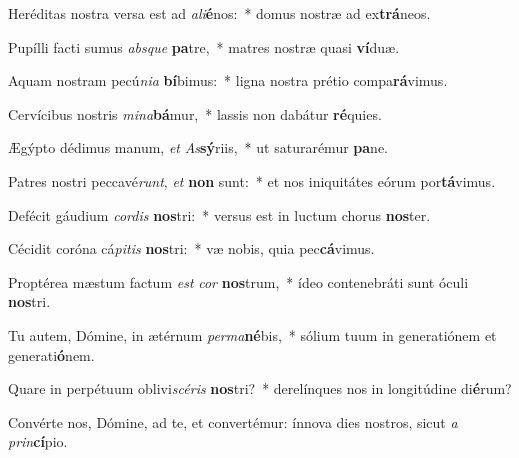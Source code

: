 \item Heréditas nostra versa est ad \textit{a}\textit{li}\textbf{é}nos:~* domus nostræ ad ex\textbf{trá}neos.
\item Pupílli facti sumus \textit{abs}\textit{que} \textbf{pa}tre,~* matres nostræ quasi \textbf{ví}duæ.
\item Aquam nostram pecú\textit{ni}\textit{a} \textbf{bí}bimus:~* ligna nostra prétio compa\textbf{rá}vimus.
\item Cervícibus nostris \textit{mi}\textit{na}\textbf{bá}mur,~* lassis non dabátur \textbf{ré}quies.
\item Ægýpto dédimus manum, \textit{et} \textit{As}\textbf{sý}riis,~* ut saturarémur \textbf{pa}ne.
\item Patres nostri peccavé\textit{runt}, \textit{et} \textbf{non} sunt:~* et nos iniquitátes eórum por\textbf{tá}vimus.
\item Defécit gáudium \textit{cor}\textit{dis} \textbf{nos}tri:~* versus est in luctum chorus \textbf{nos}ter.
\item Cécidit coróna cá\textit{pi}\textit{tis} \textbf{nos}tri:~* væ nobis, quia pec\textbf{cá}vimus.
\item Proptérea mæstum factum \textit{est} \textit{cor} \textbf{nos}trum,~* ídeo contenebráti sunt óculi \textbf{nos}tri.
\item Tu autem, Dómine, in ætérnum \textit{per}\textit{ma}\textbf{né}bis,~* sólium tuum in generatiónem et generati\textbf{ó}nem.
\item Quare in perpétuum oblivi\textit{scé}\textit{ris} \textbf{nos}tri?~* derelínques nos in longitúdine di\textbf{é}rum?
\item Convérte nos, Dómine, ad te, et convertémur: ínnova dies nostros, sicut \textit{a} \textit{prin}\textbf{cí}pio.
